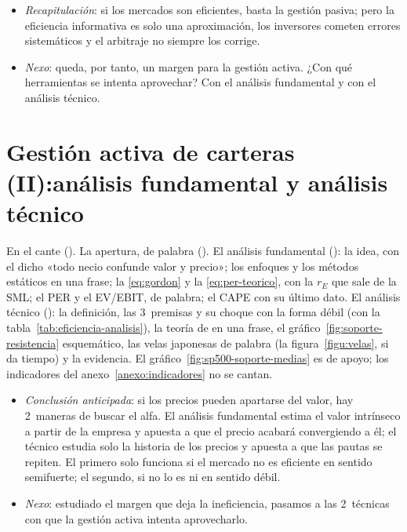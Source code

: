 \documentclass[11pt]{article}
\begin{document}
\begin{itemize}
\item \emph{Recapitulación}: si los mercados son eficientes, basta la gestión pasiva; pero la eficiencia informativa es solo una aproximación, los inversores cometen errores sistemáticos y el arbitraje no siempre los corrige.
\item \emph{Nexo}: queda, por tanto, un margen para la gestión activa. ¿Con qué herramientas se intenta aprovechar? Con el análisis fundamental y con el análisis técnico.
\end{itemize}

\section{Gestión activa de carteras (II):\newline análisis fundamental y análisis técnico}\label{sec:fundamental-tecnico}

\begin{notaopositor}
En el cante (). La apertura, de palabra (). El análisis fundamental (): la idea, con el dicho «todo necio confunde valor y precio»; los enfoques y los métodos estáticos en una frase; la \eqref{eq:gordon} y la \eqref{eq:per-teorico}, con la $r_E$ que sale de la SML; el PER y el EV/EBIT, de palabra; el CAPE con su último dato. El análisis técnico (): la definición, las 3~premisas y su choque con la forma débil (con la tabla~\ref{tab:eficiencia-analisis}), la teoría de  en una frase, el gráfico~\ref{fig:soporte-resistencia} esquemático, las velas japonesas de palabra (la figura~\ref{figu:velas}, si da tiempo) y la evidencia. El gráfico~\ref{fig:sp500-soporte-medias} es de apoyo; los indicadores del anexo~\ref{anexo:indicadores} no se cantan.
\end{notaopositor}

\begin{itemize}
\item \emph{Conclusión anticipada}: si los precios pueden apartarse del valor, hay 2~maneras de buscar el alfa. El análisis fundamental estima el valor intrínseco a partir de la empresa y apuesta a que el precio acabará convergiendo a él; el técnico estudia solo la historia de los precios y apuesta a que las pautas se repiten. El primero solo funciona si el mercado no es eficiente en sentido semifuerte; el segundo, si no lo es ni en sentido débil.
\item \emph{Nexo}: estudiado el margen que deja la ineficiencia, pasamos a las 2~técnicas con que la gestión activa intenta aprovecharlo.
\end{itemize}
\end{document}
